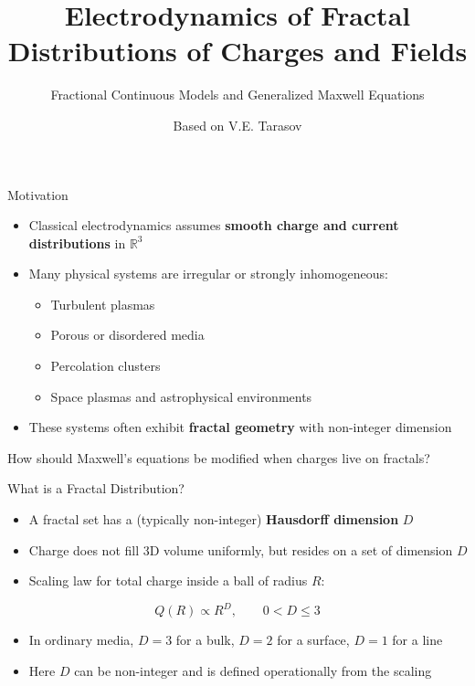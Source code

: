 \documentclass[11pt]{beamer}
\title[Fractal Electrodynamics]{Electrodynamics of Fractal Distributions of Charges and Fields}
\subtitle{Fractional Continuous Models and Generalized Maxwell Equations}
\author{Based on V.E. Tarasov}
\institute{By Gytis Vėjelis}
\date{}
\begin{document}
\begin{frame}
  \titlepage
\end{frame}

\begin{frame}{Motivation}
\begin{itemize}
  \item Classical electrodynamics assumes \textbf{smooth charge and current distributions} in $\mathbb{R}^3$
  \item Many physical systems are irregular or strongly inhomogeneous:
  \begin{itemize}
    \item Turbulent plasmas
    \item Porous or disordered media
    \item Percolation clusters
    \item Space plasmas and astrophysical environments
  \end{itemize}
  \item These systems often exhibit \textbf{fractal geometry} with non-integer dimension
\end{itemize}
\vspace{0.3cm}
How should Maxwell's equations be modified when charges live on fractals?
\end{frame}

\begin{frame}{What is a Fractal Distribution?}
\begin{itemize}
  \item A fractal set has a (typically non-integer) \textbf{Hausdorff dimension} $D$
  \item Charge does not fill 3D volume uniformly, but resides on a set of dimension $D$
  \item Scaling law for total charge inside a ball of radius $R$:
\end{itemize}
\begin{equation*}
  Q(R) \propto R^D, \qquad 0 < D \le 3
\end{equation*}
\begin{itemize}
  \item In ordinary media, $D = 3$ for a bulk, $D = 2$ for a surface, $D = 1$ for a line
  \item Here $D$ can be non-integer and is defined operationally from the scaling
\end{itemize}
\end{frame}
\end{document}
